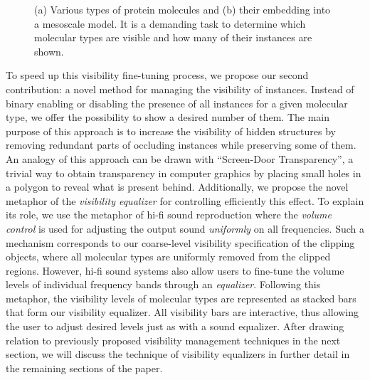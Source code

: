 \begin{figure}[t]
\centering
{}
\caption{\label{fig:which} (a) Various types of protein molecules and (b) their embedding into a mesoscale  model. It is a demanding task to determine which molecular types are visible and how many of their instances are shown.}
\vspace{-5mm}
\end{figure}


To speed up this visibility fine-tuning process, we propose our second contribution: a novel method for managing the visibility of instances. Instead of binary enabling or disabling the presence of all instances for a given molecular type, we offer the possibility to show a desired number of them.
The main purpose of this approach is to increase the visibility of hidden structures by removing redundant parts of occluding instances while preserving some of them.
An analogy of this approach can be drawn with ``Screen-Door Transparency'', a trivial way to obtain transparency in computer graphics by placing small holes in a polygon to reveal what is present behind.
Additionally, we propose the novel metaphor of the \emph{visibility equalizer} for controlling efficiently this effect.
To explain its role, we use the metaphor of hi-fi sound reproduction where the \textit{volume control} is used for adjusting the output sound \textit{uniformly} on all frequencies. 
Such a mechanism corresponds to our coarse-level visibility specification of the clipping objects, where all molecular types are uniformly removed from the clipped regions.
However, hi-fi sound systems also allow users to fine-tune the volume levels of individual frequency bands through an \emph{equalizer}.
Following this metaphor, the visibility levels of molecular types are represented as stacked bars that form our visibility equalizer.
All visibility bars are interactive, thus allowing the user to adjust desired levels just as with a sound equalizer. After drawing relation to previously proposed visibility management techniques in the next section, we will discuss the technique of visibility equalizers in further detail in the remaining sections of the paper.
